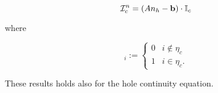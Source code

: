 \begin{equation}
\mathcal{I}_c^n = (An_h-\mathbf{b})\cdot \mathbb{I}_c
\end{equation} 

where

\begin{equation}
[\mathbb{I}_c]_i := \left\{ \begin{array}{ll}
0 & i \notin \eta_c \\
1 & i \in \eta_c .
\end{array}  \right.
\end{equation} 

These results holds also for the hole continuity equation. 

%
%
%
%
%
%
%
%
%
%
